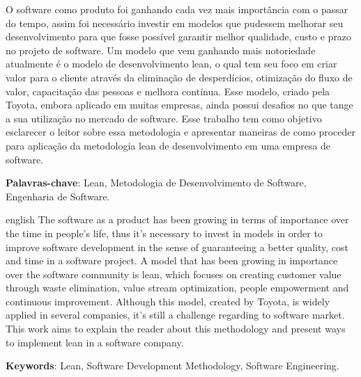 


\setlength{\absparsep}{18pt} 
\begin{resumo}
O software como produto foi ganhando cada vez mais importância com o passar do tempo, assim foi necessário investir em modelos que pudessem melhorar seu desenvolvimento para que fosse possível garantir melhor qualidade, custo e prazo no projeto de software. Um modelo que vem ganhando mais notoriedade atualmente é o modelo de desenvolvimento lean, o qual tem seu foco em criar valor para o cliente através da eliminação de desperdícios, otimização do fluxo de valor, capacitação das pessoas e melhora contínua. Esse modelo, criado pela Toyota, embora aplicado em muitas empresas, ainda possui desafios no que tange a sua utilização no mercado de software. Esse trabalho tem como objetivo esclarecer o leitor sobre essa metodologia e apresentar maneiras de como proceder para aplicação da metodologia lean de desenvolvimento em uma empresa de software.

\textbf{Palavras-chave}: Lean, Metodologia de Desenvolvimento de Software, Engenharia de Software. %

\end{resumo}
 
 
\begin{resumo}[ABSTRACT]
 \begin{otherlanguage*}{english}
 The software as a product has been growing in terms of importance over the time in people’s life, thus it's necessary to invest in models in order to improve software development in the sense of guaranteeing a better quality, cost and time in a software project. A model that has been growing in importance over the software community is lean, which focuses on creating customer value through waste elimination, value stream optimization, people empowerment and continuous improvement. Although this model, created by Toyota, is widely applied in several companies, it’s still a challenge regarding to software market. This work aims to explain the reader about this methodology and present ways to implement lean in a software company.

\textbf{Keywords}: Lean, Software Development Methodology, Software Engineering.
 \end{otherlanguage*}
\end{resumo}

